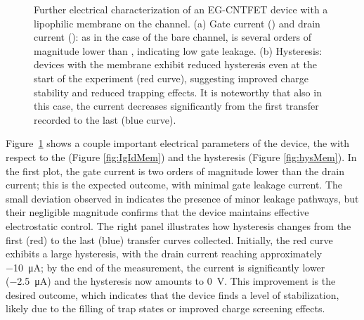 \begin{figure}
    \centering
    \quad
    \caption{Further electrical characterization of an EG-CNTFET device with a lipophilic membrane on the channel. 
    (a) Gate current (\igs{}) and drain current (\ids{}): as in the case of the bare channel, \igs{} is several orders of magnitude lower than \ids{}, indicating low gate leakage. 
    (b) Hysteresis: devices with the membrane exhibit reduced hysteresis even at the start of the experiment (red curve), suggesting improved charge stability and reduced trapping effects. It is noteworthy that also in this case, the current decreases significantly from the first transfer recorded to the last (blue curve).}
    \label{fig:parameters_Mem}
\end{figure}

Figure~\ref{fig:parameters_Mem} shows a couple important electrical parameters of the device, \ie{} the \igs{} with respect to the \ids{} (Figure \ref{fig:IgIdMem}) and the hysteresis (Figure \ref{fig:hysMem}). In the first plot, the gate current is two orders of magnitude lower than the drain current; this is the expected outcome, with minimal gate leakage current. The small deviation observed in \igs{} indicates the presence of minor leakage pathways, but their negligible magnitude confirms that the device maintains effective electrostatic control. The right panel illustrates how hysteresis changes from the first (red) to the last (blue) transfer curves collected. Initially, the red curve exhibits a large hysteresis, with the drain current reaching approximately \SI{-10}{\uA}; by the end of the measurement, the current is significantly lower (\SI{-2.5}{\uA}) and the hysteresis now amounts to \SI{0}{\V}. This improvement is the desired outcome, which indicates that the device finds a level of stabilization, likely due to the filling of trap states or improved charge screening effects.

